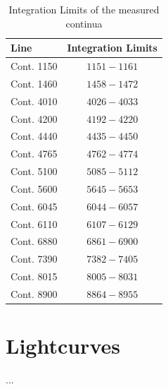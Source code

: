 \begin{table}[h!]
	\centering
	\small
	\caption{Integration Limits of the measured continua}
	\label{tab:continua}
	\begin{tabular}{lc}
		\hline
		\hline
		\textbf{Line} & \textbf{Integration Limits}  \\
		\hline
		Cont. 1150 & $1151-1161$\\
		Cont. 1460 & $1458-1472$\\
		Cont. 4010 & $4026-4033$\\
		Cont. 4200 & $4192-4220$\\
		Cont. 4440 & $4435-4450$\\
		Cont. 4765 & $4762-4774$\\
		Cont. 5100 & $5085-5112$\\
		Cont. 5600 & $5645-5653$\\
		Cont. 6045 & $6044-6057$\\
		Cont. 6110 & $6107-6129$\\
		Cont. 6880 & $6861-6900$\\
		Cont. 7390 & $7382-7405$\\
		Cont. 8015 & $8005-8031$\\
		Cont. 8900 & $8864-8955$\\
		\hline
		\hline
	\end{tabular}
\end{table}




\section{Lightcurves}
...
